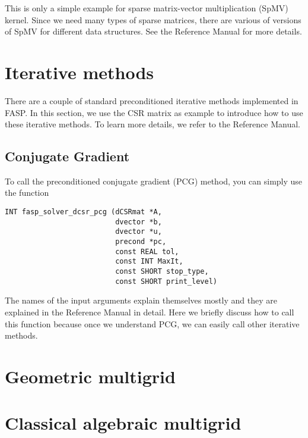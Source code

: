 \documentclass[11pt]{memoir}
\begin{document}
This is only a simple example for sparse matrix-vector multiplication (SpMV) kernel. Since we need many types of sparse matrices, there are various of versions of SpMV for different data structures. See the Reference Manual for more details. 

\section{Iterative methods}\label{sec:iter}

There are a couple of standard preconditioned iterative methods implemented in FASP. In this section, we use the CSR matrix as example to introduce how to use these iterative methods. To learn more details, we refer to the Reference Manual.

\subsection{Conjugate Gradient}

To call the preconditioned conjugate gradient (PCG) method, you can simply use the function
\begin{lstlisting}[numbers=none]
INT fasp_solver_dcsr_pcg (dCSRmat *A, 
                          dvector *b, 
                          dvector *u, 
                          precond *pc, 
                          const REAL tol,
                          const INT MaxIt, 
                          const SHORT stop_type,
                          const SHORT print_level)
\end{lstlisting}
%
The names of the input arguments explain themselves mostly and they are explained in the Reference Manual in detail. Here we briefly discuss how to call this function because once we understand PCG, we can easily call other iterative methods.   


\section{Geometric multigrid}\label{sec:gmg}

\section{Classical algebraic multigrid}\label{sec:camg}

\end{document}
